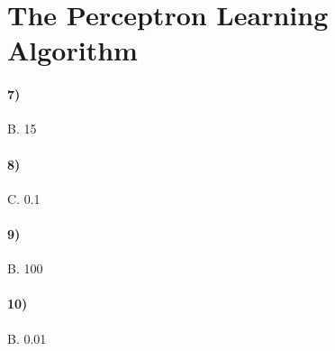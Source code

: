 \documentclass[10pt,letter]{article}
\begin{document}
\section*{The Perceptron Learning Algorithm}

\paragraph{7)} B. 15

\paragraph{8)} C. 0.1

\paragraph{9)} B. 100

\paragraph{10)} B. 0.01
\end{document}
